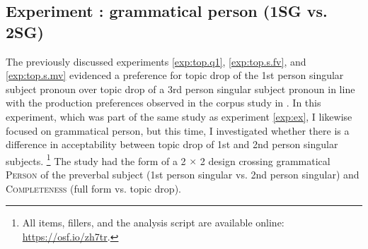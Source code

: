 \label{exp:1sg.2sg}
\subsection{Experiment : grammatical person (1SG vs. 2SG) }
\label{sec:exp.1sg.2sg}
The previously discussed experiments \ref*{exp:top.q1}, \ref*{exp:top.s.fv}, and \ref*{exp:top.s.mv} evidenced a preference for topic drop of the 1st person singular subject pronoun over topic drop of a 3rd person singular subject pronoun in line with the production preferences observed in the corpus study in .
In this experiment, which was part of the same study as experiment \ref*{exp:ex}, I likewise focused on grammatical person, but this time, I investigated whether there is a difference in acceptability between topic drop of 1st and 2nd person singular subjects.%
\footnote{All items, fillers, and the analysis script are available online: \url{https://osf.io/zh7tr}.}
%
The study had the form of a 2 $\times$ 2 design crossing grammatical \textsc{Person} of the preverbal subject (1st person singular vs. 2nd person singular) and \textsc{Completeness} (full form vs. topic drop).

